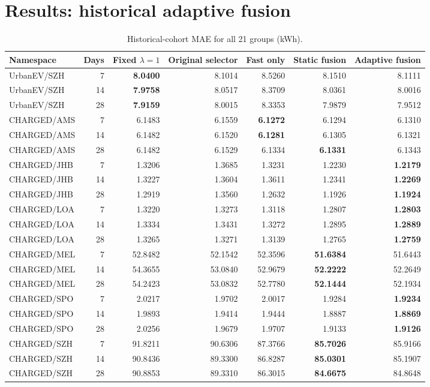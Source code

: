 \documentclass[pdflatex,iicol,sn-mathphys-num]{sn-jnl}
\begin{document}
\section{Results: historical adaptive fusion}
\begin{table}[t]
\centering\small
\caption{Historical-cohort MAE for all 21 groups (kWh).}\label{tab:cohort}
\begin{tabular*}{\textwidth}{@{\extracolsep{\fill}}lrrrrrr@{}}\toprule
Namespace & Days & Fixed $\lambda=1$ & Original selector & Fast only & Static fusion & Adaptive fusion\\\midrule
UrbanEV/SZH & 7 & \textbf{8.0400} & 8.1014 & 8.5260 & 8.1510 & 8.1111\\
UrbanEV/SZH & 14 & \textbf{7.9758} & 8.0517 & 8.3709 & 8.0361 & 8.0016\\
UrbanEV/SZH & 28 & \textbf{7.9159} & 8.0015 & 8.3353 & 7.9879 & 7.9512\\
\addlinespace[3pt]
CHARGED/AMS & 7 & 6.1483 & 6.1559 & \textbf{6.1272} & 6.1294 & 6.1310\\
CHARGED/AMS & 14 & 6.1482 & 6.1520 & \textbf{6.1281} & 6.1305 & 6.1321\\
CHARGED/AMS & 28 & 6.1482 & 6.1529 & 6.1334 & \textbf{6.1331} & 6.1343\\
\addlinespace[3pt]
CHARGED/JHB & 7 & 1.3206 & 1.3685 & 1.3231 & 1.2230 & \textbf{1.2179}\\
CHARGED/JHB & 14 & 1.3227 & 1.3604 & 1.3611 & 1.2341 & \textbf{1.2269}\\
CHARGED/JHB & 28 & 1.2919 & 1.3560 & 1.2632 & 1.1926 & \textbf{1.1924}\\
\addlinespace[3pt]
CHARGED/LOA & 7 & 1.3220 & 1.3273 & 1.3118 & 1.2807 & \textbf{1.2803}\\
CHARGED/LOA & 14 & 1.3334 & 1.3431 & 1.3272 & 1.2895 & \textbf{1.2889}\\
CHARGED/LOA & 28 & 1.3265 & 1.3271 & 1.3139 & 1.2765 & \textbf{1.2759}\\
\addlinespace[3pt]
CHARGED/MEL & 7 & 52.8482 & 52.1542 & 52.3596 & \textbf{51.6384} & 51.6443\\
CHARGED/MEL & 14 & 54.3655 & 53.0840 & 52.9679 & \textbf{52.2222} & 52.2649\\
CHARGED/MEL & 28 & 54.2423 & 53.0832 & 52.7780 & \textbf{52.1444} & 52.1934\\
\addlinespace[3pt]
CHARGED/SPO & 7 & 2.0217 & 1.9702 & 2.0017 & 1.9284 & \textbf{1.9234}\\
CHARGED/SPO & 14 & 1.9893 & 1.9414 & 1.9444 & 1.8887 & \textbf{1.8869}\\
CHARGED/SPO & 28 & 2.0256 & 1.9679 & 1.9707 & 1.9133 & \textbf{1.9126}\\
\addlinespace[3pt]
CHARGED/SZH & 7 & 91.8211 & 90.6306 & 87.3766 & \textbf{85.7026} & 85.9166\\
CHARGED/SZH & 14 & 90.8436 & 89.3300 & 86.8287 & \textbf{85.0301} & 85.1907\\
CHARGED/SZH & 28 & 90.8853 & 89.3310 & 86.3015 & \textbf{84.6675} & 84.8648\\
\bottomrule\end{tabular*}
\end{table}
\end{document}
